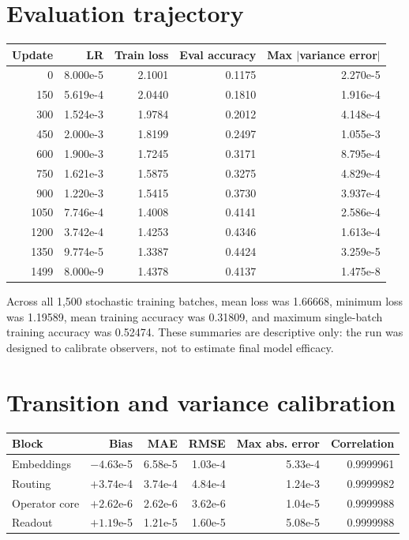 \documentclass[10pt,letterpaper]{article}
\begin{document}
\section{Evaluation trajectory}

\begin{center}
\small
\begin{tabular}{rrrrr}
\toprule
Update & LR & Train loss & Eval accuracy & Max $|$variance error$|$ \\
\midrule
0    & 8.000e-5 & 2.1001 & 0.1175 & 2.270e-5 \\
150  & 5.619e-4 & 2.0440 & 0.1810 & 1.916e-4 \\
300  & 1.524e-3 & 1.9784 & 0.2012 & 4.148e-4 \\
450  & 2.000e-3 & 1.8199 & 0.2497 & 1.055e-3 \\
600  & 1.900e-3 & 1.7245 & 0.3171 & 8.795e-4 \\
750  & 1.621e-3 & 1.5875 & 0.3275 & 4.829e-4 \\
900  & 1.220e-3 & 1.5415 & 0.3730 & 3.937e-4 \\
1050 & 7.746e-4 & 1.4008 & 0.4141 & 2.586e-4 \\
1200 & 3.742e-4 & 1.4253 & 0.4346 & 1.613e-4 \\
1350 & 9.774e-5 & 1.3387 & 0.4424 & 3.259e-5 \\
1499 & 8.000e-9 & 1.4378 & 0.4137 & 1.475e-8 \\
\bottomrule
\end{tabular}
\end{center}

Across all 1,500 stochastic training batches, mean loss was 1.66668, minimum
loss was 1.19589, mean training accuracy was 0.31809, and maximum single-batch
training accuracy was 0.52474.  These summaries are descriptive only: the run
was designed to calibrate observers, not to estimate final model efficacy.

\section{Transition and variance calibration}

\begin{center}
\small
\begin{tabular}{lrrrrr}
\toprule
Block & Bias & MAE & RMSE & Max abs. error & Correlation \\
\midrule
Embeddings & $-4.63$e-5 & 6.58e-5 & 1.03e-4 & 5.33e-4 & 0.9999961 \\
Routing & $+3.74$e-4 & 3.74e-4 & 4.84e-4 & 1.24e-3 & 0.9999982 \\
Operator core & $+2.62$e-6 & 2.62e-6 & 3.62e-6 & 1.04e-5 & 0.9999988 \\
Readout & $+1.19$e-5 & 1.21e-5 & 1.60e-5 & 5.08e-5 & 0.9999988 \\
\bottomrule
\end{tabular}
\end{center}
\end{document}
